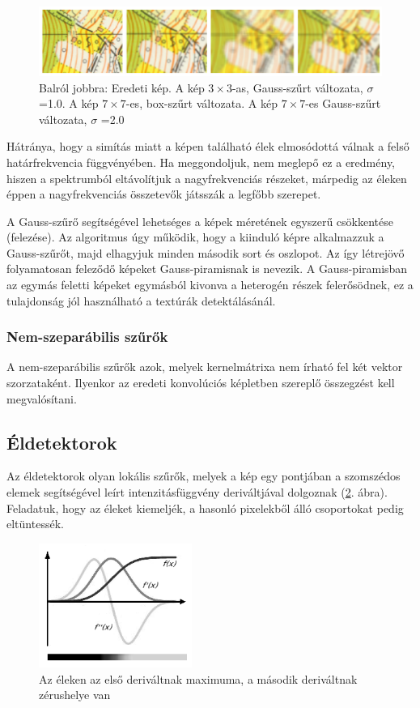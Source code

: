 \documentclass[a4paper,12pt]{article}
\begin{document}
\begin{figure}
	\centering
	\includegraphics[width=14cm]{simitok.png}
	\caption{Balról jobbra: Eredeti kép. A kép $3\times3$-as, Gauss-szűrt változata,
		$\sigma$=1.0. A kép $7\times7$-es, box-szűrt változata. A kép $7\times7$-es
		Gauss-szűrt változata, $\sigma$ =2.0 }
	\label{fig:simitok}
\end{figure}


Hátránya, hogy a simítás miatt a képen található élek elmosódottá válnak a felső
határfrekvencia függvényében. Ha meggondoljuk, nem meglepő ez a eredmény, hiszen
a spektrumból eltávolítjuk a nagyfrekvenciás részeket, márpedig az éleken éppen
a nagyfrekvenciás összetevők játsszák a legfőbb szerepet.

A Gauss-szűrő segítségével lehetséges a képek méretének egyszerű csökkentése
(felezése). Az algoritmus úgy működik, hogy a kiinduló képre alkalmazzuk a
Gauss-szűrőt, majd elhagyjuk minden második sort és oszlopot. Az így létrejövő
folyamatosan feleződő képeket Gauss-piramisnak is nevezik. A Gauss-piramisban az
egymás feletti képeket egymásból kivonva a heterogén részek felerősödnek, ez a
tulajdonság jól használható a textúrák detektálásánál.


\subsubsection{Nem-szeparábilis szűrők}

A nem-szeparábilis szűrők azok, melyek kernelmátrixa nem írható fel két vektor
szorzataként. Ilyenkor az eredeti konvolúciós képletben szereplő összegzést kell
megvalósítani.

\subsection{Éldetektorok}

Az éldetektorok olyan lokális szűrők, melyek a kép egy pontjában a szomszédos
elemek segítségével leírt intenzitásfüggvény deriváltjával dolgoznak
(\ref{fig:derivalt_szurok}. ábra). Feladatuk, hogy az éleket kiemeljék, a
hasonló pixelekből álló csoportokat pedig eltüntessék. 


\begin{figure}
	\centering
	\includegraphics[width=5cm]{derivalt_szurok.png}
	\caption{Az éleken az első deriváltnak maximuma, a második deriváltnak
		zérushelye van }
	\label{fig:derivalt_szurok}
\end{figure}
\end{document}
